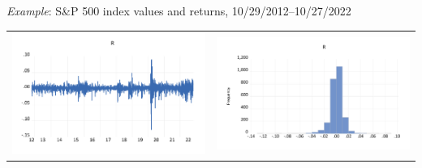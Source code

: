 \begin{frame}
\begin{block}{\emph{Example}: S\&P 500 index values and returns, 10/29/2012--10/27/2022}
\begin{center}
\begin{tabular}{rr}
\includegraphics[height=0.3\textheight]{returnssp500}&\includegraphics[height=0.3\textheight]{histsp500}
\end{tabular}
\end{center}
\end{block}
\end{frame}%
